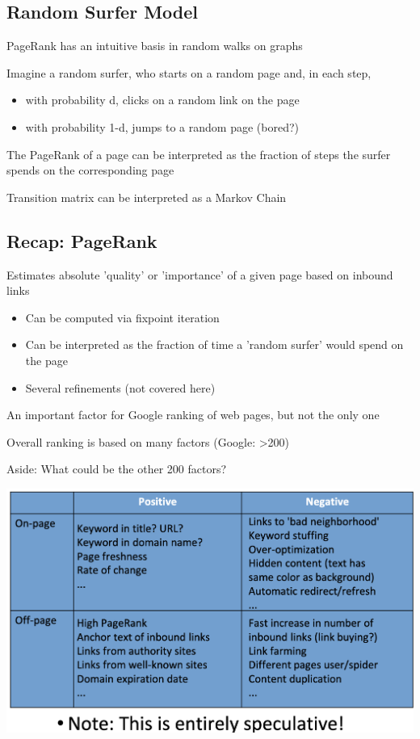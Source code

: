 \documentclass[11pt]{article}
\theoremstyle{definition}
\begin{document}
\subsection{Random Surfer Model}
PageRank has an intuitive basis in random walks on graphs

Imagine a random surfer, who starts on a random page and, in each
step,

\begin{itemize}
    \item with probability d, clicks on a random link on the page
    \item with probability 1-d, jumps to a random page (bored?)
\end{itemize}

The PageRank of a page can be interpreted as the fraction of steps the
surfer spends on the corresponding page

Transition matrix can be interpreted as a Markov Chain

\subsection{Recap: PageRank}
Estimates absolute 'quality' or 'importance' of a given
page based on inbound links

\begin{itemize}
    \item Can be computed via fixpoint iteration
    \item Can be interpreted as the fraction of time a 'random
    surfer' would spend on the page
    \item Several refinements (not covered here)
\end{itemize}

An important factor for Google ranking of web pages, but
not the only one

Overall ranking is based on many factors (Google: >200)

Aside: What could be the other
200 factors?

\includegraphics[width=\textwidth/2]{36.png}
\end{document}
